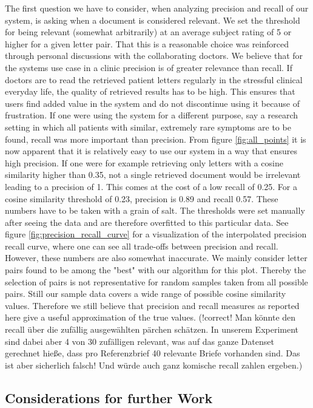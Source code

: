 The first question we have to consider, when analyzing precision and recall of our system, is asking when a document is considered relevant. We set the threshold for being relevant (somewhat arbitrarily) at an average subject rating of 5 or higher for a given letter pair. That this is a reasonable choice was reinforced through personal discussions with the collaborating doctors. We believe that for the systems use case in a clinic precision is of greater relevance than recall. If doctors are to read the retrieved patient letters regularly in the stressful clinical everyday life, the quality of retrieved results has to be high. This ensures that users find added value in the system and do not discontinue using it because of frustration. If one were using the system for a different purpose, say a research setting in which all patients with similar, extremely rare symptoms are to be found, recall was more important than precision. From figure \ref{fig:all_points} it is now apparent that it is relatively easy to use our system in a way that ensures high precision. If one were for example retrieving only letters with a cosine similarity higher than 0.35, not a single retrieved document would be irrelevant leading to a precision of 1. This comes at the cost of a low recall of 0.25. For a cosine similarity threshold of 0.23, precision is 0.89 and recall 0.57. These numbers have to be taken with a grain of salt. The thresholds were set manually after seeing the data and are therefore overfitted to this particular data. See figure \ref{fig:precision_recall_curve} for a visualization of the interpolated precision recall curve, where one can see all trade-offs between precision and recall. However, these numbers are also somewhat inaccurate. We mainly consider letter pairs found to be among the "best" with our algorithm for this plot. Thereby the selection of pairs is not representative for random samples taken from all possible pairs. Still our sample data covers a wide range of possible cosine similarity values. Therefore we still believe that precision and recall measures as reported here give a useful approximation of the true values.  (!correct! Man könnte den recall über die zufällig ausgewählten pärchen schätzen. In unserem Experiment sind dabei aber 4 von 30 zufälligen relevant, was auf das ganze Datenset gerechnet hieße, dass pro Referenzbrief 40 relevante Briefe vorhanden sind. Das ist aber sicherlich falsch! Und würde auch ganz komische recall zahlen ergeben.)


\subsection*{Considerations for further Work}

